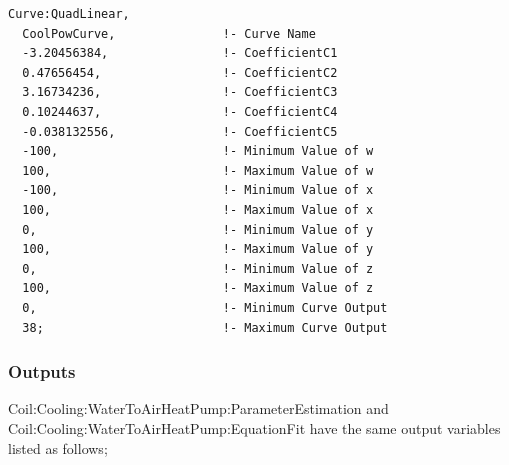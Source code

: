 \begin{lstlisting}
Curve:QuadLinear,
  CoolPowCurve,               !- Curve Name
  -3.20456384,                !- CoefficientC1
  0.47656454,                 !- CoefficientC2
  3.16734236,                 !- CoefficientC3
  0.10244637,                 !- CoefficientC4
  -0.038132556,               !- CoefficientC5
  -100,                       !- Minimum Value of w
  100,                        !- Maximum Value of w
  -100,                       !- Minimum Value of x
  100,                        !- Maximum Value of x
  0,                          !- Minimum Value of y
  100,                        !- Maximum Value of y
  0,                          !- Minimum Value of z
  100,                        !- Maximum Value of z
  0,                          !- Minimum Curve Output
  38;                         !- Maximum Curve Output
\end{lstlisting}

\subsubsection{Outputs}\label{outputs-25}

Coil:Cooling:WaterToAirHeatPump:ParameterEstimation and Coil:Cooling:WaterToAirHeatPump:EquationFit have the same output variables listed as follows;

